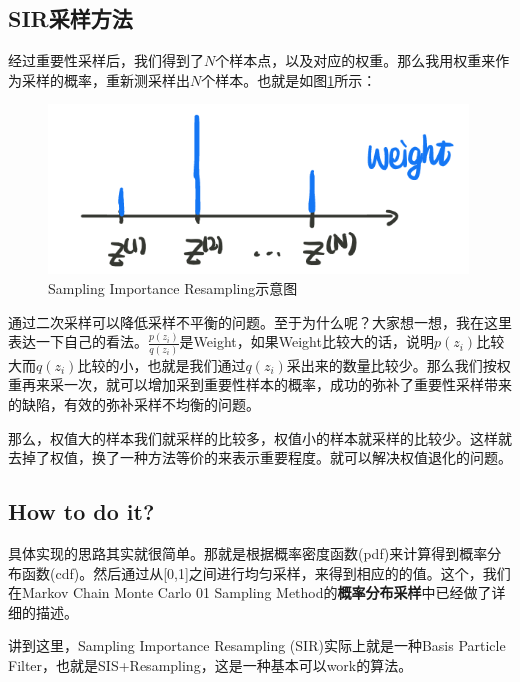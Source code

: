 \documentclass[a4paper]{article}
\begin{document}
\subsection{SIR采样方法}
经过重要性采样后，我们得到了$N$个样本点，以及对应的权重。那么我用权重来作为采样的概率，重新测采样出$N$个样本。也就是如图\ref{fig:my_label_1}所示：
\begin{figure}[H]
    \centering
    \includegraphics[width=.5\textwidth]{pic/微信图片_20191230154011.png}
    \caption{Sampling Importance Resampling示意图}
    \label{fig:my_label_1}
\end{figure}

通过二次采样可以降低采样不平衡的问题。至于为什么呢？大家想一想，我在这里表达一下自己的看法。$\frac{p(z_i)}{q(z_i)}$是Weight，如果Weight比较大的话，说明$p(z_i)$比较大而$q(z_i)$比较的小，也就是我们通过$q(z_i)$采出来的数量比较少。那么我们按权重再来采一次，就可以增加采到重要性样本的概率，成功的弥补了重要性采样带来的缺陷，有效的弥补采样不均衡的问题。

那么，权值大的样本我们就采样的比较多，权值小的样本就采样的比较少。这样就去掉了权值，换了一种方法等价的来表示重要程度。就可以解决权值退化的问题。

\subsection{How to do it?}
具体实现的思路其实就很简单。那就是根据概率密度函数(pdf)来计算得到概率分布函数(cdf)。然后通过从[0,1]之间进行均匀采样，来得到相应的的值。这个，我们在Markov Chain Monte Carlo 01 Sampling Method的\textbf{概率分布采样}中已经做了详细的描述。

讲到这里，Sampling Importance Resampling (SIR)实际上就是一种Basis Particle Filter，也就是SIS+Resampling，这是一种基本可以work的算法。
\end{document}
